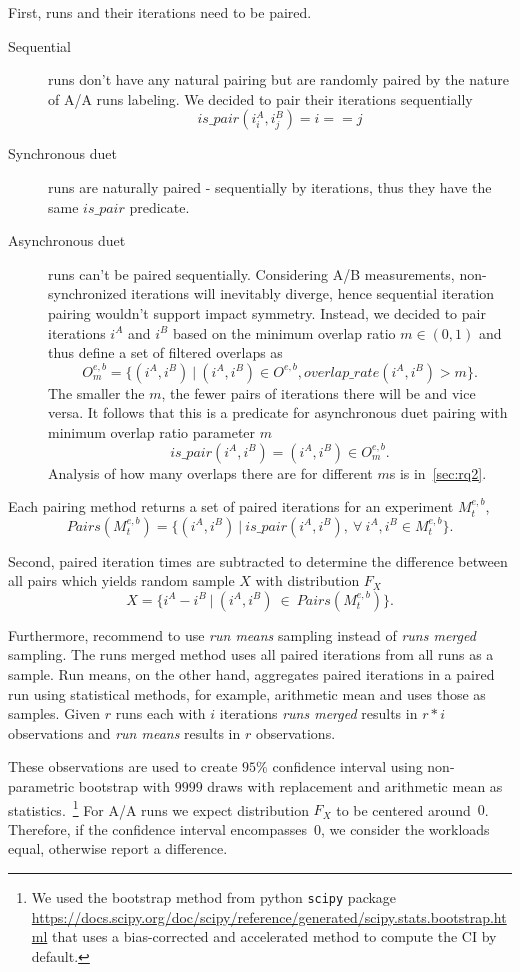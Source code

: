 First, runs and their iterations need to be paired.
\begin{description}
    \item[Sequential] runs don't have any natural pairing but are randomly paired by the nature of A/A runs labeling. We decided to pair their iterations sequentially
        $$
        is\_pair(i^A_i, i^B_j) = i == j
        $$
    \item[Synchronous duet] runs are naturally paired - sequentially by iterations, thus they have the same $is\_pair$ predicate.
    \item[Asynchronous duet] runs can't be paired sequentially.
        Considering A/B measurements, non-synchronized iterations will inevitably diverge, hence sequential iteration pairing wouldn't support impact symmetry.
        Instead, we decided to pair iterations $i^A$ and $i^B$ based on the minimum overlap ratio $m \in (0, 1)$ and thus define a set of filtered overlaps as
        $$
        O^{e,b}_m = \{(i^A, i^B)~|~(i^A, i^B) \in O^{e, b}, overlap\_rate(i^A, i^B) > m\}.
        $$
        The smaller the $m$, the fewer pairs of iterations there will be and vice versa.
        It follows that this is a predicate for asynchronous duet pairing with minimum overlap ratio parameter $m$
        $$
        is\_pair(i^A, i^B) = (i^A, i^B) \in O^{e,b}_m.
        $$
        Analysis of how many overlaps there are for different $m$s is in~\cref{sec:rq2}.
\end{description}
Each pairing method returns a set of paired iterations for an experiment $M^{e, b}_t$,
$$
Pairs(M^{e, b}_t) = \{(i^A, i^B)~|~is\_pair(i^A, i^B),~\forall~i^A, i^B \in M^{e, b}_t\}.
$$

Second, paired iteration times are subtracted to determine the difference between all pairs which yields random sample $X$ with distribution $F_X$
$$
X = \{i^A - i^B~|~(i^A, i^B)~\in~Pairs(M^{e, b}_t)\}.
$$

Furthermore, \citet{bulej2017stat} recommend to use \emph{run means} sampling instead of \emph{runs merged} sampling.
The runs merged method uses all paired iterations from all runs as a sample.
Run means, on the other hand, aggregates paired iterations in a paired run using statistical methods, for example, arithmetic mean and uses those as samples.
Given $r$ runs each with $i$ iterations \emph{runs merged} results in $r * i$ observations and \emph{run means} results in $r$ observations.

These observations are used to create $95\%$ confidence interval using non-parametric bootstrap with $9999$ draws with replacement and arithmetic mean as statistics.~\footnote{We used the bootstrap method from python \lstinline{scipy} package \url{https://docs.scipy.org/doc/scipy/reference/generated/scipy.stats.bootstrap.html} that uses a \mbox{bias-corrected} and accelerated method to compute the CI by default.}
For A/A runs we expect distribution $F_X$ to be centered around~$0$.
Therefore, if the confidence interval encompasses~$0$, we consider the workloads equal, otherwise report a difference.
 

